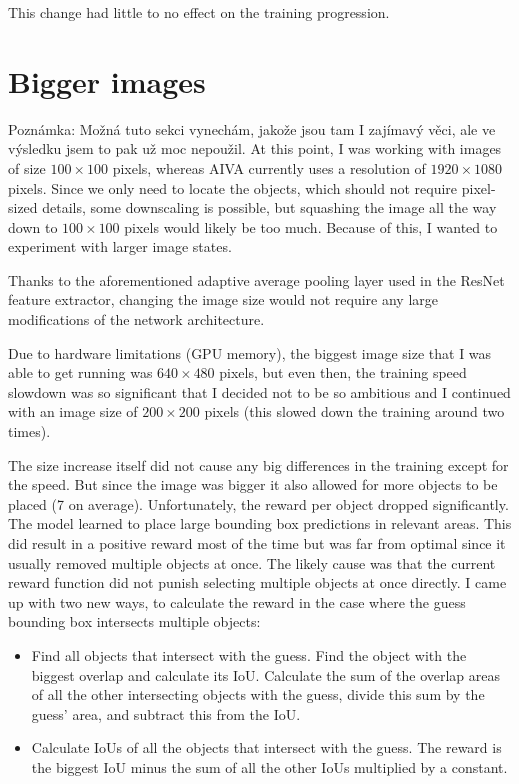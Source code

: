 \documentclass[
  digital,     %
  oneside,     %
  nosansbold,  %
  nocolorbold, %
  lof,         %
  lot,         %
]{fithesis4}
\begin{document}
This change had little to no effect on the training progression.

\section{Bigger images}
Poznámka: Možná tuto sekci vynechám, jakože jsou tam I zajímavý věci, ale ve výsledku jsem to pak už moc nepoužil.
At this point, I was working with images of size $100\times100$ pixels, whereas AIVA currently uses a resolution of $1920\times1080$ pixels. Since we only need to locate the objects, which should not require pixel-sized details, some downscaling is possible, but squashing the image all the way down to $100\times100$ pixels would likely be too much. Because of this, I wanted to experiment with larger image states.

Thanks to the aforementioned adaptive average pooling layer used in the ResNet feature extractor, changing the image size would not require any large modifications of the network architecture.

Due to hardware limitations (GPU memory), the biggest image size that I was able to get running was $640\times480$ pixels, but even then, the training speed slowdown was so significant that I decided not to be so ambitious and I continued with an image size of $200\times200$ pixels (this slowed down the training around two times).

The size increase itself did not cause any big differences in the training except for the speed. But since the image was bigger it also allowed for more objects to be placed (7 on average). Unfortunately, the reward per object dropped significantly. The model learned to place large bounding box predictions in relevant areas. This did result in a positive reward most of the time but was far from optimal since it usually removed multiple objects at once. The likely cause was that the current reward function did not punish selecting multiple objects at once directly. I came up with two new ways, to calculate the reward in the case where the guess bounding box intersects multiple objects:

\begin{itemize}
    \item Find all objects that intersect with the guess. Find the object with the biggest overlap and calculate its IoU. Calculate the sum of the overlap areas of all the other intersecting objects with the guess, divide this sum by the guess' area, and subtract this from the IoU.
    \item Calculate IoUs of all the objects that intersect with the guess. The reward is the biggest IoU minus the sum of all the other IoUs multiplied by a constant.
\end{itemize}
\end{document}
